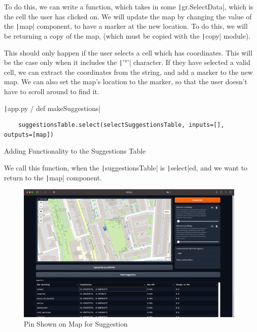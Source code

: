 \documentclass[12pt]{report}
\newcommand{\pil}[1]{\protect\texttt|#1|}
\begin{document}
To do this, we can write a function, which takes in some \pil{gr.SelectData}, which is the cell the user has clicked on. We will update the map by changing the value of the \pil{map} component, to have a marker at the new location. To do this, we will be returning a copy of the map, (which must be copied with the \pil{copy} module).

This should only happen if the user selects a cell which has coordinates. This will be the case only when it includes the \pil{'°'} character. If they have selected a valid cell, we can extract the coordinates from the string, and add a marker to the new map. We can also set the map's location to the marker, so that the user doesn't have to scroll around to find it.

\begin{listing}[H]
\pil{app.py / def makeSuggestions}
\begin{verbatim}
    suggestionsTable.select(selectSuggestionsTable, inputs=[], outputs=[map])
\end{verbatim}
\caption{Adding Functionality to the Suggestions Table}\label{cs:functionalityToSuggestionsTable}
\end{listing}

We call this function, when the \pil{suggestionsTable} is \pil{select}ed, and we want to return to the \pil{map} component.

\begin{figure}[H]
\centering
\includegraphics[width=14cm]{ss13.5.png}
\caption{Pin Shown on Map for Suggestion}\label{fig:ss13.5}
\end{figure}
\end{document}
